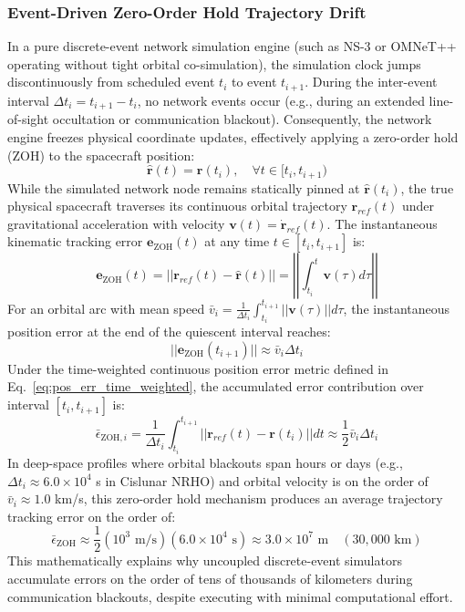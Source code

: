 \documentclass[a4paper,fleqn]{cas-sc}
\begin{document}
\subsubsection{Event-Driven Zero-Order Hold Trajectory Drift}
In a pure discrete-event network simulation engine (such as NS-3 or OMNeT++ operating without tight orbital co-simulation), the simulation clock jumps discontinuously from scheduled event $t_i$ to event $t_{i+1}$. During the inter-event interval $\Delta t_i = t_{i+1} - t_i$, no network events occur (e.g., during an extended line-of-sight occultation or communication blackout). Consequently, the network engine freezes physical coordinate updates, effectively applying a zero-order hold (ZOH) to the spacecraft position:
\begin{equation}
    \hat{\mathbf{r}}(t) = \mathbf{r}(t_i), \quad \forall t \in [t_i, t_{i+1})
\end{equation}
While the simulated network node remains statically pinned at $\hat{\mathbf{r}}(t_i)$, the true physical spacecraft traverses its continuous orbital trajectory $\mathbf{r}_{ref}(t)$ under gravitational acceleration with velocity $\mathbf{v}(t) = \dot{\mathbf{r}}_{ref}(t)$. The instantaneous kinematic tracking error $\mathbf{e}_{\text{ZOH}}(t)$ at any time $t \in [t_i, t_{i+1}]$ is:
\begin{equation}
    \mathbf{e}_{\text{ZOH}}(t) = ||\mathbf{r}_{ref}(t) - \hat{\mathbf{r}}(t)|| = \left|\left|\int_{t_i}^t \mathbf{v}(\tau) d\tau\right|\right|
\end{equation}
For an orbital arc with mean speed $\bar{v}_i = \frac{1}{\Delta t_i}\int_{t_i}^{t_{i+1}} ||\mathbf{v}(\tau)|| d\tau$, the instantaneous position error at the end of the quiescent interval reaches:
\begin{equation}
    ||\mathbf{e}_{\text{ZOH}}(t_{i+1})|| \approx \bar{v}_i \Delta t_i
\end{equation}
Under the time-weighted continuous position error metric defined in Eq.~\eqref{eq:pos_err_time_weighted}, the accumulated error contribution over interval $[t_i, t_{i+1}]$ is:
\begin{equation}
    \bar{\epsilon}_{\text{ZOH}, i} = \frac{1}{\Delta t_i} \int_{t_i}^{t_{i+1}} ||\mathbf{r}_{ref}(t) - \mathbf{r}(t_i)|| dt \approx \frac{1}{2} \bar{v}_i \Delta t_i
\end{equation}
In deep-space profiles where orbital blackouts span hours or days (e.g., $\Delta t_i \approx 6.0 \times 10^4$ s in Cislunar NRHO) and orbital velocity is on the order of $\bar{v}_i \approx 1.0$ km/s, this zero-order hold mechanism produces an average trajectory tracking error on the order of:
\begin{equation}
    \bar{\epsilon}_{\text{ZOH}} \approx \frac{1}{2} (10^3\text{ m/s}) (6.0 \times 10^4\text{ s}) \approx 3.0 \times 10^7\text{ m} \quad (30,000\text{ km})
\end{equation}
This mathematically explains why uncoupled discrete-event simulators accumulate errors on the order of tens of thousands of kilometers during communication blackouts, despite executing with minimal computational effort.
\end{document}
